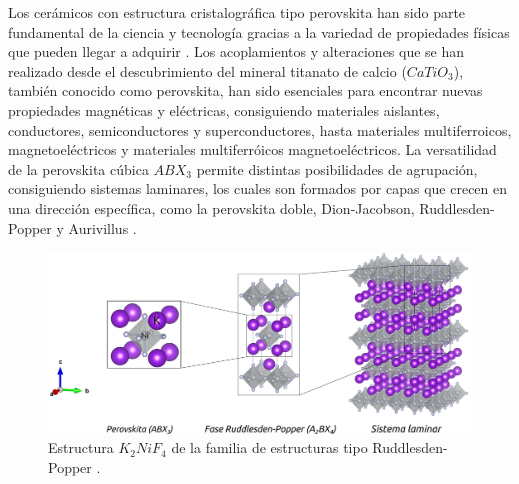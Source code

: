 
Los cerámicos con estructura cristalográfica tipo perovskita han sido parte fundamental de la ciencia y tecnología gracias a la variedad de propiedades físicas que pueden llegar a adquirir \cite{Howard2005StructuresApproach,Sarmiento-Perez2015PredictionPerovskites}. Los acoplamientos y alteraciones que se han realizado desde el descubrimiento del mineral titanato de calcio ($CaTiO_{3}$), también conocido como perovskita, han sido esenciales para encontrar nuevas propiedades magnéticas y eléctricas, consiguiendo materiales aislantes\cite{Tokura1997Metal-insulatorOxide}, conductores\cite{Chen2017Atomic-ScaleStructures}, semiconductores\cite{Garcia-Esparza2019FullFuels} y superconductores\cite{Maeno1994SuperconductivityCopper}, hasta materiales multiferroicos\cite{Cruz2014PiezoelectricThickness}, magnetoeléctricos\cite{Fiebig2005RevivalEffect} y materiales multiferróicos magnetoeléctricos\cite{Hill2000WhyFerroelectrics}. La versatilidad de la perovskita cúbica $ABX_{3}$ permite distintas posibilidades de agrupación, consiguiendo sistemas laminares, los cuales son formados por capas que crecen en una dirección específica, como la perovskita doble, Dion-Jacobson, Ruddlesden-Popper y Aurivillus \cite{Benedek2015Undestanding}.

\begin{figure}[h!]
    \centering
    \includegraphics[width=13.0cm,keepaspectratio=true]{Figs/material1.png}
    \caption{Estructura $K_{2}NiF_{4}$ de la familia de estructuras tipo Ruddlesden-Popper \cite{NRuddl1957NewType}.}
    \label{fig:k2nif4}
\end{figure}

